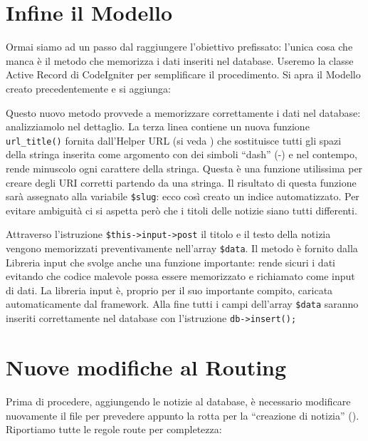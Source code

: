 \section*{Infine il Modello}
Ormai siamo ad un passo dal raggiungere l'obiettivo prefissato: l'unica cosa che manca è il metodo che memorizza i dati inseriti nel database. Useremo la classe Active Record di CodeIgniter per semplificare il procedimento. Si apra il Modello creato precedentemente e si aggiunga:


Questo nuovo metodo provvede a memorizzare correttamente i dati nel database: analizziamolo nel dettaglio. La terza linea contiene un nuova funzione \verb|url_title()| fornita dall'Helper URL (si veda ) che sostituisce tutti gli spazi della stringa inserita come argomento con dei simboli ``dash'' (-) e nel contempo, rende minuscolo ogni carattere della stringa. Questa è una funzione utilissima per creare degli \ac{URI} corretti partendo da una stringa. Il risultato di questa funzione sarà assegnato alla variabile \verb|$slug|: ecco così creato un indice automatizzato. Per evitare ambiguità ci si aspetta però che i titoli delle notizie siano tutti differenti.

Attraverso l'istruzione \verb|$this->input->post| il titolo e il testo della notizia vengono memorizzati preventivamente nell'array \verb|$data|. Il metodo  è fornito dalla Libreria input che svolge anche una funzione importante: rende sicuri i dati evitando che codice malevole possa essere memorizzato e richiamato come input di dati. La libreria input è, proprio per il suo importante compito, caricata automaticamente dal framework. Alla fine tutti i campi dell'array \verb|$data| saranno inseriti correttamente nel database con l'istruzione \verb|db->insert();|

\section*{Nuove modifiche al Routing}
Prima di procedere, aggiungendo le notizie al database, è necessario modificare nuovamente il file  per prevedere appunto la rotta per la ``creazione di notizia'' (). Riportiamo tutte le regole route per completezza:

